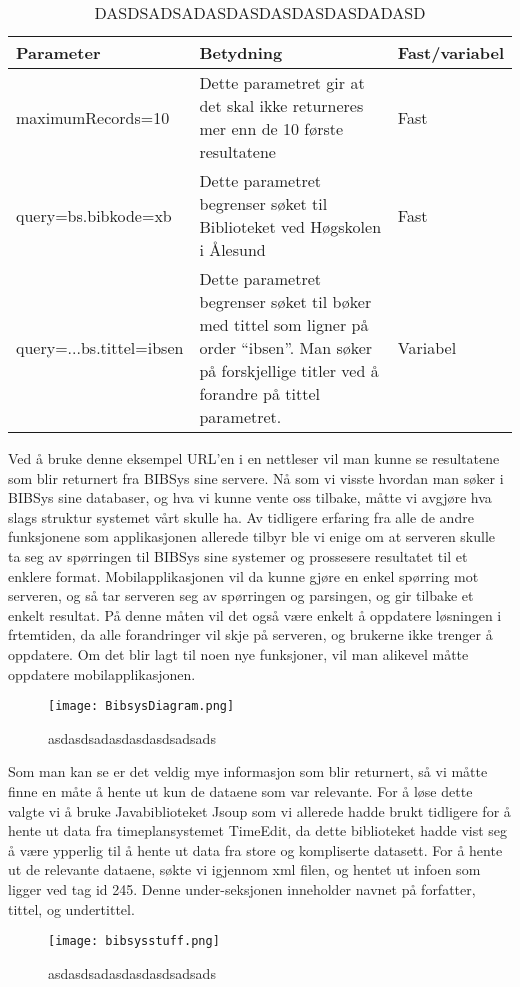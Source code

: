 \documentclass[../main.tex]{subfiles}
\begin{document}
\begin{table}[H]
\begin{center}
\caption{DASDSADSADASDASDASDASDASDADASD}
  \begin{tabular}{ | p{4cm} | p{8cm} | p{2cm} |}
    \hline
    Parameter & Betydning & Fast/variabel \\ \hline
    maximumRecords=10 & Dette parametret gir at det skal ikke returneres mer enn de 10 første resultatene & Fast \\ \hline
    query=bs.bibkode=xb & Dette parametret begrenser søket til Biblioteket ved Høgskolen i Ålesund & Fast \\ \hline
    query=...bs.tittel=ibsen & Dette parametret begrenser søket til bøker med tittel som ligner på order “ibsen”. Man søker på forskjellige titler ved å forandre på tittel parametret. & Variabel \\
    \hline
  \end{tabular}
\end{center}
\end{table}

Ved å bruke denne eksempel URL’en i en nettleser vil man kunne se resultatene som blir returnert fra BIBSys sine servere.\newline
\newline
Nå som vi visste hvordan man søker i BIBSys sine databaser, og hva vi kunne vente oss tilbake, måtte vi avgjøre hva slags struktur systemet vårt skulle ha. Av tidligere erfaring fra alle de andre funksjonene som applikasjonen allerede tilbyr ble vi enige om at serveren skulle ta seg av spørringen til BIBSys sine systemer og prossesere resultatet til et enklere format. Mobilapplikasjonen vil da kunne gjøre en enkel spørring mot serveren, og så tar serveren seg av spørringen og parsingen, og gir tilbake et enkelt resultat. På denne måten vil det også være enkelt å oppdatere løsningen i frtemtiden, da alle forandringer vil skje på serveren, og brukerne ikke trenger å oppdatere. Om det blir lagt til noen nye funksjoner, vil man alikevel måtte oppdatere mobilapplikasjonen.

\begin{figure}[H]
  \centering
  \texttt{[image: BibsysDiagram.png]}
  \caption{asdasdsadasdasdasdsadsads}
\end{figure}

Som man kan se er det veldig mye informasjon som blir returnert, så vi måtte finne en måte å hente ut kun de dataene som var relevante. For å løse dette valgte vi å bruke Javabiblioteket Jsoup som vi allerede hadde brukt tidligere for å hente ut data fra timeplansystemet TimeEdit, da dette biblioteket hadde vist seg å være ypperlig til å hente ut data fra store og kompliserte datasett.\newline
\newline
For å hente ut de relevante dataene, søkte vi igjennom xml filen, og hentet ut infoen som ligger ved tag id 245. Denne under-seksjonen inneholder navnet på forfatter, tittel, og undertittel.
\begin{figure}[H]
  \centering
  \texttt{[image: bibsysstuff.png]}
  \caption{asdasdsadasdasdasdsadsads}
\end{figure}
\end{document}

